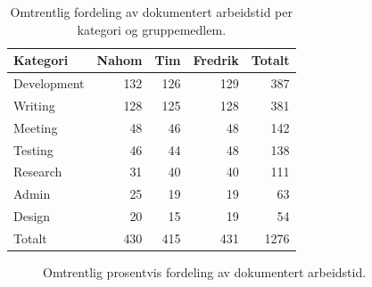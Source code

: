\begin{table}[H]
\centering
\small
\begin{tabular}{lrrrr}
\toprule
Kategori & Nahom & Tim & Fredrik & Totalt \\
\midrule
Development & 132 & 126 & 129 & 387 \\
Writing & 128 & 125 & 128 & 381 \\
Meeting & 48 & 46 & 48 & 142 \\
Testing & 46 & 44 & 48 & 138 \\
Research & 31 & 40 & 40 & 111 \\
Admin & 25 & 19 & 19 & 63 \\
Design & 20 & 15 & 19 & 54 \\
\midrule
Totalt & 430 & 415 & 431 & 1276 \\
\bottomrule
\end{tabular}
\caption{Omtrentlig fordeling av dokumentert arbeidstid per kategori og gruppemedlem.}
\label{tab:timekategori}
\end{table}

\begin{figure}[H]
\centering
{}
\caption{Omtrentlig prosentvis fordeling av dokumentert arbeidstid.}
\label{fig:timefordeling-pie}
\end{figure}